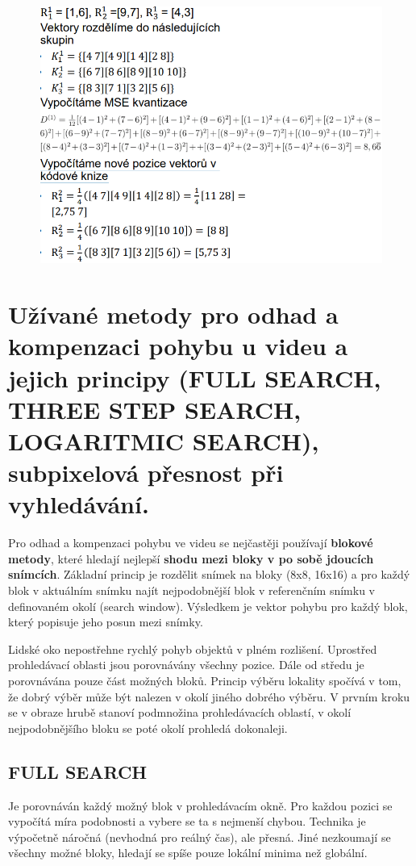 \begin{figure}[ht]
    \centering
    \includegraphics[width=0.5\linewidth]{images/LBG.png}
\end{figure}
\FloatBarrier


\section{Užívané metody pro odhad a kompenzaci pohybu u videu a jejich principy (FULL SEARCH, THREE STEP SEARCH, LOGARITMIC SEARCH), subpixelová přesnost při vyhledávání.}

Pro odhad a kompenzaci pohybu ve videu se nejčastěji používají \textbf{blokové metody}, které hledají nejlepší \textbf{shodu mezi bloky v po sobě jdoucích snímcích}. Základní princip je rozdělit snímek na bloky (8x8, 16x16) a pro každý blok v aktuálním snímku najít nejpodobnější blok v referenčním snímku v definovaném okolí (search window). Výsledkem je vektor pohybu pro každý blok, který popisuje jeho posun mezi snímky. 

Lidské oko nepostřehne rychlý pohyb objektů v plném rozlišení. Uprostřed prohledávací oblasti jsou porovnávány všechny pozice. Dále od středu je porovnávána pouze část možných bloků. Princip výběru lokality spočívá v tom, že dobrý výběr může být nalezen v okolí jiného dobrého výběru. V prvním kroku se v obraze hrubě stanoví podmnožina prohledávacích oblastí, v okolí nejpodobnějšího bloku se poté okolí prohledá dokonaleji.


\subsection{FULL SEARCH}

Je porovnáván každý možný blok v prohledávacím okně. Pro každou pozici se vypočítá míra podobnosti a vybere se ta s nejmenší chybou. Technika je výpočetně náročná (nevhodná pro reálný čas), ale přesná. Jiné nezkoumají se všechny možné bloky, hledají se spíše pouze lokální minima než globální.


